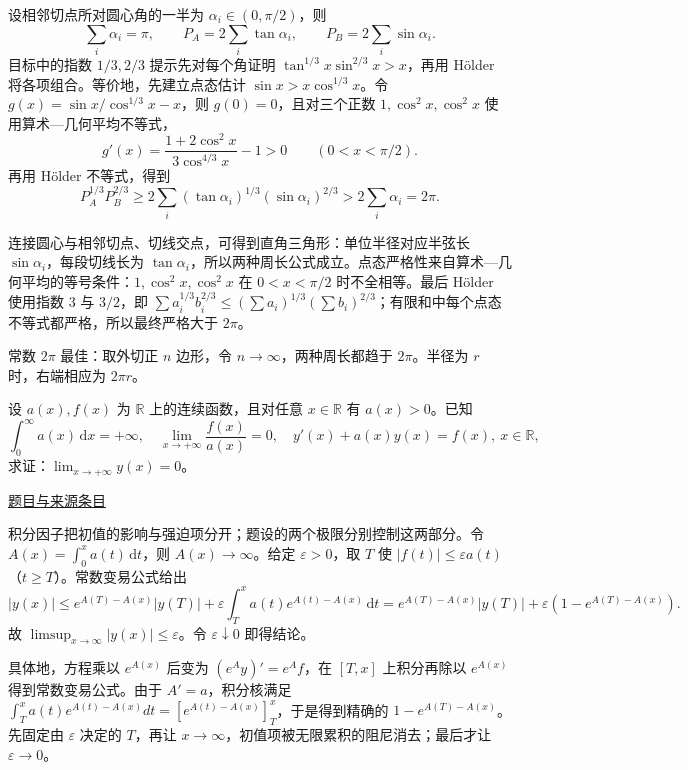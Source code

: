 \documentclass[12pt,fontset=fandol]{ctexart}
\begin{document}
\begin{solve}\label{ans:fin07-hi:7}

设相邻切点所对圆心角的一半为 $\alpha_i\in(0,\pi/2)$，则
\[
\sum_i\alpha_i=\pi,\qquad P_A=2\sum_i\tan\alpha_i,\qquad P_B=2\sum_i\sin\alpha_i.
\]
目标中的指数 $1/3,2/3$ 提示先对每个角证明 $\tan^{1/3}x\sin^{2/3}x>x$，再用 Hölder 将各项组合。等价地，先建立点态估计 $\sin x>x\cos^{1/3}x$。令 $g(x)=\sin x/\cos^{1/3}x-x$，则 $g(0)=0$，且对三个正数 $1,\cos^2x,\cos^2x$ 使用算术---几何平均不等式，
\[
g'(x)=\frac{1+2\cos^2x}{3\cos^{4/3}x}-1>0\qquad(0<x<\pi/2).
\]
再用 Hölder 不等式，得到
\[
P_A^{1/3}P_B^{2/3}\geq2\sum_i(\tan\alpha_i)^{1/3}(\sin\alpha_i)^{2/3}>2\sum_i\alpha_i=2\pi.
\]

连接圆心与相邻切点、切线交点，可得到直角三角形：单位半径对应半弦长 $\sin\alpha_i$，每段切线长为 $\tan\alpha_i$，所以两种周长公式成立。点态严格性来自算术—几何平均的等号条件：$1,\cos^2x,\cos^2x$ 在 $0<x<\pi/2$ 时不全相等。最后 Hölder 使用指数 $3$ 与 $3/2$，即 $\sum a_i^{1/3}b_i^{2/3}\le(\sum a_i)^{1/3}(\sum b_i)^{2/3}$；有限和中每个点态不等式都严格，所以最终严格大于 $2\pi$。

\end{solve}

\begin{remark}[方法与条件]常数 $2\pi$ 最佳：取外切正 $n$ 边形，令 $n\to\infty$，两种周长都趋于 $2\pi$。半径为 $r$ 时，右端相应为 $2\pi r$。\end{remark}

\begin{example}\label{ex:fin07-lo:8}\label{pr:fin07-lo:8}

设 $a(x),f(x)$ 为 $\mathbb{R}$ 上的连续函数，且对任意 $x\in\mathbb{R}$ 有 $a(x)>0$。已知
\[
\int_{0}^{\infty}a(x)\,\mathrm{d}x=+\infty,\quad \lim_{x\to+\infty}\frac{f(x)}{a(x)}=0,\quad y'(x)+a(x)y(x)=f(x),\ x\in\mathbb{R},
\]
求证：$\lim_{x\to+\infty}y(x)=0$。

\par\href{https://github.com/lzxcr/cmc-mathematics/blob/64916fa1fdbc3e444a652eca204d5669058ee321/src/problems/finals/07/08.md}{题目与来源条目}

\end{example}

\begin{solve}\label{ans:fin07-lo:8}

积分因子把初值的影响与强迫项分开；题设的两个极限分别控制这两部分。令 $A(x)=\int_0^xa(t)\,\mathrm{d}t$，则 $A(x)\to\infty$。给定 $\varepsilon>0$，取 $T$ 使 $|f(t)|\leq\varepsilon a(t)$（$t\geq T$）。常数变易公式给出
\[
|y(x)|\leq e^{A(T)-A(x)}|y(T)|+\varepsilon\int_T^xa(t)e^{A(t)-A(x)}\,\mathrm{d}t
=e^{A(T)-A(x)}|y(T)|+\varepsilon(1-e^{A(T)-A(x)}).
\]
故 $\limsup_{x\to\infty}|y(x)|\leq\varepsilon$。令 $\varepsilon\downarrow0$ 即得结论。

具体地，方程乘以 $e^{A(x)}$ 后变为 $(e^Ay)'=e^Af$，在 $[T,x]$ 上积分再除以 $e^{A(x)}$ 得到常数变易公式。由于 $A'=a$，积分核满足 $\int_T^xa(t)e^{A(t)-A(x)}dt=[e^{A(t)-A(x)}]_T^x$，于是得到精确的 $1-e^{A(T)-A(x)}$。先固定由 $\varepsilon$ 决定的 $T$，再让 $x\to\infty$，初值项被无限累积的阻尼消去；最后才让 $\varepsilon\to0$。

\end{solve}
\end{document}
